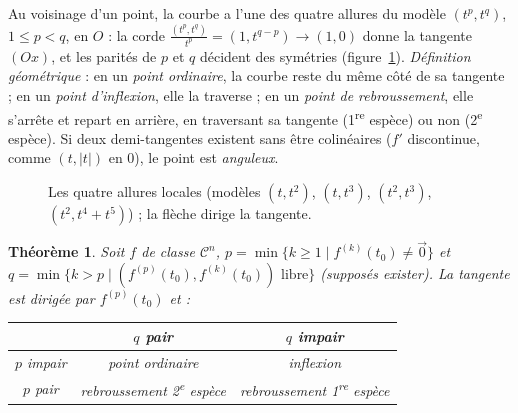 \documentclass[a4paper,11pt]{article}
\numberwithin{equation}{section}
\numberwithin{figure}{section}
\numberwithin{table}{section}
\theoremstyle{enonce}
\newtheorem{theoreme}[definition]{Théorème}
\theoremstyle{exemple}
\theoremstyle{remarque}
\newcommand{\ve}[1]{\vec{#1}}
\begin{document}
Au voisinage d'un point, la courbe a l'une des quatre allures du modèle $(t^p,t^q)$, $1\leq p<q$, en $O$ : la corde
$\frac{(t^p,t^q)}{t^p}=(1,t^{q-p})\to(1,0)$ donne la tangente $(Ox)$, et les parités de $p$ et $q$ décident des symétries
(figure~\ref{fig:pq}). \emph{Définition géométrique} : en un \emph{point ordinaire}, la courbe reste du même côté de sa
tangente ; en un \emph{point d'inflexion}, elle la traverse ; en un \emph{point de rebroussement}, elle s'arrête et repart
en arrière, en traversant sa tangente (1\textsuperscript{re} espèce) ou non (2\textsuperscript{e} espèce). Si deux
demi-tangentes existent sans être colinéaires ($f'$ discontinue, comme $(t,|t|)$ en $0$), le point est \emph{anguleux}.

\begin{figure}[H]
\centering
{}
\caption{Les quatre allures locales (modèles $(t,t^2)$, $(t,t^3)$, $(t^2,t^3)$, $(t^2,t^4+t^5)$) ; la flèche dirige la tangente.}
\label{fig:pq}
\end{figure}

\begin{theoreme}\label{thm:pq}
Soit $f$ de classe $\mathcal C^n$, $p=\min\{k\geq1\mid f^{(k)}(t_0)\neq\ve0\}$ et
$q=\min\{k>p\mid(f^{(p)}(t_0),f^{(k)}(t_0))\text{ libre}\}$ (supposés exister). La tangente est dirigée par $f^{(p)}(t_0)$ et :
\begin{center}
\begin{tabular}{c|cc}
 & $q$ pair & $q$ impair\\\hline
$p$ impair & point ordinaire & inflexion\\
$p$ pair & rebroussement 2\textsuperscript{e} espèce & rebroussement 1\textsuperscript{re} espèce
\end{tabular}
\end{center}
\end{theoreme}
\end{document}
